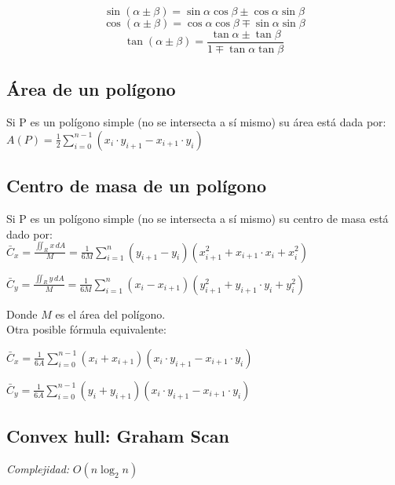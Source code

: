 \documentclass[10pt,letterpaper,twocolumn,twosided]{article}
\newcommand{\codigofuente}[1]{

\dotfill
}
\begin{document}
$$ \sin(\alpha \pm \beta) = \sin \alpha \cos \beta \pm \cos \alpha \sin \beta $$
$$ \cos(\alpha \pm \beta) = \cos \alpha \cos \beta \mp \sin \alpha \sin \beta $$
$$ \tan(\alpha \pm \beta) = \frac{\tan \alpha \pm \tan \beta}{1 \mp \tan \alpha \tan \beta} $$


\subsection{Área de un polígono}
Si P es un polígono simple (no se intersecta a sí mismo) su área está dada por: \\

$ A(P) = \frac{1}{2} \displaystyle\sum_{i=0}^{n-1} (x_{i} \cdot y_{i+1} - x_{i+1} \cdot y_{i}) $ \\
\bigskip
\codigofuente{./src/geometria/polygon_area.cpp}

\subsection{Centro de masa de un polígono}
Si P es un polígono simple (no se intersecta a sí mismo) su centro de masa está dado por: \\

$ \displaystyle\bar{C}_{x} = \frac{ \displaystyle\iint_{R} x \, dA }{M} = \frac{1}{6M}\sum_{i=1}^{n} (y_{i+1} - y_{i}) (x_{i+1}^2 + x_{i+1} \cdot x_{i} + x_{i}^2) $

\medskip

$\displaystyle\bar{C}_{y} = \frac{ \displaystyle\iint_{R} y \, dA }{M} = \frac{1}{6M} \sum_{i=1}^{n} (x_{i} - x_{i+1}) (y_{i+1}^2 + y_{i+1} \cdot y_{i} + y_{i}^2)$

\medskip

Donde $ M $ es el área del polígono. \\

Otra posible fórmula equivalente:

$ \displaystyle\bar{C}_{x} = \frac{1}{6A} \sum_{i=0}^{n-1} (x_{i} + x_{i+1}) (x_{i} \cdot y_{i+1} - x_{i+1} \cdot y_{i}) $

\medskip

$ \displaystyle\bar{C}_{y} = \frac{1}{6A} \sum_{i=0}^{n-1} (y_{i} + y_{i+1}) (x_{i} \cdot y_{i+1} - x_{i+1} \cdot y_{i}) $


\subsection{Convex hull: Graham Scan}
\emph{Complejidad:} $ O(n \log_{2}{n}) $
\codigofuente{./src/geometria/grahamscan.cpp}
\end{document}
